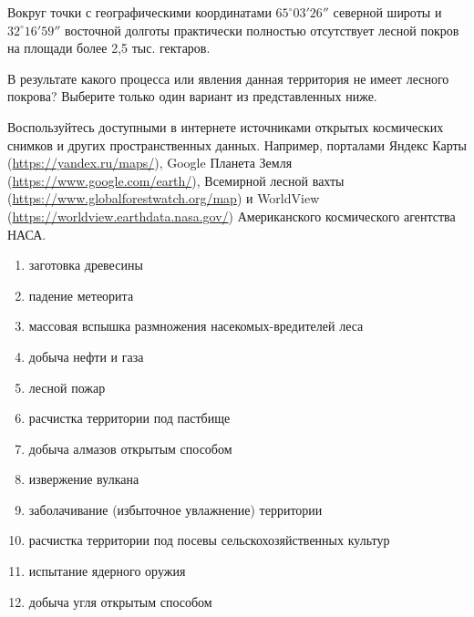 
Вокруг точки с географическими координатами $65^{\circ}03'26''$ северной широты и $32^{\circ}16'59''$ 
восточной долготы практически полностью отсутствует лесной покров на площади более 2,5 тыс. гектаров.

В результате какого процесса или явления данная территория не имеет лесного покрова? Выберите только один вариант из представленных ниже.

Воспользуйтесь доступными в интернете источниками открытых космических снимков и других пространственных данных. 
Например, порталами Яндекс Карты (\url{https://yandex.ru/maps/}), Google Планета Земля (\url{https://www.google.com/earth/}), 
Всемирной лесной вахты (\url{https://www.globalforestwatch.org/map}) и \linebreak WorldView (\url{https://worldview.earthdata.nasa.gov/}) Американского космического агентства НАСА.

\begin{enumerate}
    \item заготовка древесины
    \item падение метеорита
    \item массовая вспышка размножения насекомых-вредителей леса
    \item добыча нефти и газа
    \item лесной пожар
    \item расчистка территории под пастбище
    \item добыча алмазов открытым способом
    \item извержение вулкана
    \item заболачивание (избыточное увлажнение) территории
    \item расчистка территории под посевы сельскохозяйственных культур
    \item испытание ядерного оружия
    \item добыча угля открытым способом
\end{enumerate}

